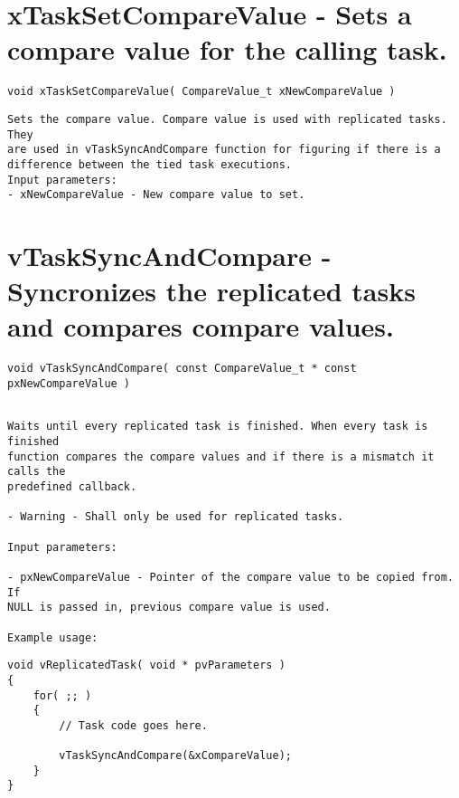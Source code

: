 \section{xTaskSetCompareValue -  Sets a compare value for the calling task.}
\label{rt_cmd:xTaskSetCompareValue}

\begin{verbatim}
void xTaskSetCompareValue( CompareValue_t xNewCompareValue )

\end{verbatim}
\begin{lstlisting}
Sets the compare value. Compare value is used with replicated tasks. They
are used in vTaskSyncAndCompare function for figuring if there is a
difference between the tied task executions.
Input parameters:
- xNewCompareValue - New compare value to set.

\end{lstlisting}
\section{vTaskSyncAndCompare -  Syncronizes the replicated tasks and compares compare values.}
\label{rt_cmd:vTaskSyncAndCompare}

\begin{verbatim}
void vTaskSyncAndCompare( const CompareValue_t * const pxNewCompareValue )


\end{verbatim}
\begin{lstlisting}
Waits until every replicated task is finished. When every task is finished
function compares the compare values and if there is a mismatch it calls the
predefined callback.

- Warning - Shall only be used for replicated tasks.

Input parameters:

- pxNewCompareValue - Pointer of the compare value to be copied from. If
NULL is passed in, previous compare value is used.

Example usage:
\end{lstlisting}
\begin{verbatim}
void vReplicatedTask( void * pvParameters )
{
    for( ;; )
    {
        // Task code goes here.

        vTaskSyncAndCompare(&xCompareValue);
    }
}

\end{verbatim}

